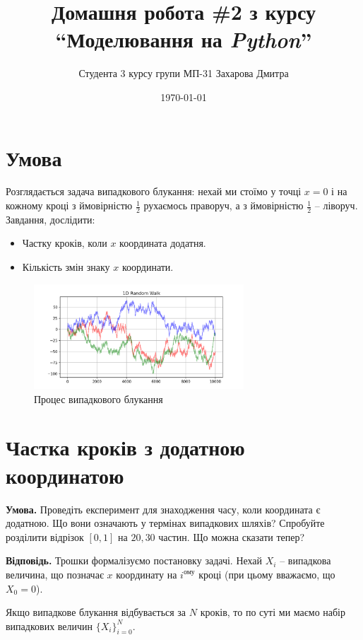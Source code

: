 \documentclass[14pt]{extarticle}
\title{Домашня робота \#2 з курсу ``Моделювання на \textit{Python}''}
\author{Студента 3 курсу групи МП-31 Захарова Дмитра}
\date{\today}
\begin{document}
\maketitle

\section*{Умова}

Розглядається задача випадкового блукання: нехай ми стоїмо у точці $x=0$ і на кожному кроці з ймовірністю $\frac{1}{2}$ рухаємось праворуч, а з ймовірністю $\frac{1}{2}$ -- ліворуч. Завдання, дослідити:
\begin{itemize}
    \item Частку кроків, коли $x$ координата додатня.
    \item Кількість змін знаку $x$ координати.
\end{itemize}

\begin{figure}
    \centering
    \includegraphics[width=0.7\textwidth]{images/hw_2/random_walk.png}
    \caption{Процес випадкового блукання}
    \label{fig:preview}
\end{figure}

\section{Частка кроків з додатною координатою}

\textbf{Умова.} Проведіть експеримент для знаходження часу, коли координата є додатною. Що вони означають у термінах випадкових шляхів? Спробуйте розділити відрізок $[0,1]$ на $20,30$ частин. Що можна сказати тепер?

\textbf{Відповідь.} Трошки формалізуємо постановку задачі. Нехай $X_i$ -- випадкова величина, що позначає $x$ координату на $i^{\text{ому}}$ кроці (при цьому вважаємо, що $X_0=0$). 

Якщо випадкове блукання відбувається за $N$ кроків, то по суті ми маємо набір випадкових величин $\{X_i\}_{i=0}^N$.
\end{document}
